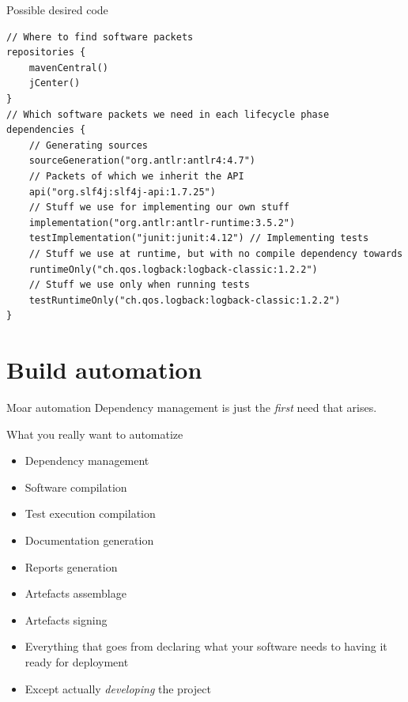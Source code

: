 \documentclass[presentation]{beamer}
\begin{document}
\begin{frame}[fragile]{Possible desired code}
  \begin{block}{}
    \begin{verbatim}
// Where to find software packets
repositories {
    mavenCentral()
    jCenter()
}
// Which software packets we need in each lifecycle phase
dependencies {
    // Generating sources
    sourceGeneration("org.antlr:antlr4:4.7")
    // Packets of which we inherit the API
    api("org.slf4j:slf4j-api:1.7.25")
    // Stuff we use for implementing our own stuff
    implementation("org.antlr:antlr-runtime:3.5.2")
    testImplementation("junit:junit:4.12") // Implementing tests
    // Stuff we use at runtime, but with no compile dependency towards
    runtimeOnly("ch.qos.logback:logback-classic:1.2.2")
    // Stuff we use only when running tests
    testRuntimeOnly("ch.qos.logback:logback-classic:1.2.2")
}
    \end{verbatim}
  \end{block}
\end{frame}

\section{Build automation}

\begin{frame}[fragile]{Moar automation}
	Dependency management is just the \textit{first} need that arises.
	
	\begin{block}{What you really want to automatize}
		\begin{itemize}
			\item Dependency management
			\item Software compilation
			\item Test execution compilation
			\item Documentation generation
			\item Reports generation
			\item Artefacts assemblage
			\item Artefacts signing
		\end{itemize}
	\end{block}
	\begin{itemize}
		\item Everything that goes from declaring what your software needs to having it ready for deployment
		\item Except actually \textit{developing} the project
	\end{itemize}
\end{frame}
\end{document}
